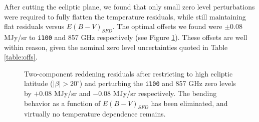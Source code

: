 \documentclass{emulateapj}
\begin{document}
After cutting the ecliptic plane, we found that only small zero level
perturbations were required to fully flatten the temperature residuals,
while still maintaining flat residuals versus $E(B-V)_{SFD}$. The optimal
offsets we found were $\pm$0.08 MJy/sr to \verb|i100| and 857 GHz respectively
(see Figure \ref{fig:resid_offs}). These offsets are well within reason, 
given the nominal zero level uncertainties quoted in Table \ref{table:offs}.

\begin{figure}
\begin{center}
\caption{\label{fig:resid_offs} Two-component reddening residuals after 
restricting to high ecliptic latitude ($|\beta|>20^{\circ}$) and perturbing the
\texttt{i100} and 857 GHz zero levels by $+$0.08 MJy/sr and $-$0.08 MJy/sr 
respectively. The bending behavior as a function of $E(B-V)_{SFD}$ has been
eliminated, and virtually no temperature dependence remains.}
\end{center}
\end{figure}





\end{document}

